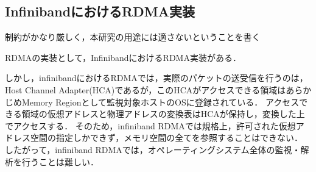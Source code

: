 
\subsection{InfinibandにおけるRDMA実装}

制約がかなり厳しく，本研究の用途には適さないということを書く

RDMAの実装として，Infiniband\cite{islam2012high}におけるRDMA実装がある．

しかし，infinibandにおけるRDMA\cite{infiniband-rdma}では，実際のパケットの送受信を行うのは，Host Channel Adapter(HCA)であるが，このHCAがアクセスできる領域はあらかじめMemory Regionとして監視対象ホストのOSに登録されている．
アクセスできる領域の仮想アドレスと物理アドレスの変換表はHCAが保持し，変換した上でアクセスする．
そのため，infiniband RDMAでは規格上，許可された仮想アドレス空間の指定しかできず，メモリ空間の全てを参照することはできない．
したがって，infiniband RDMAでは，オペレーティングシステム全体の監視・解析を行うことは難しい．
